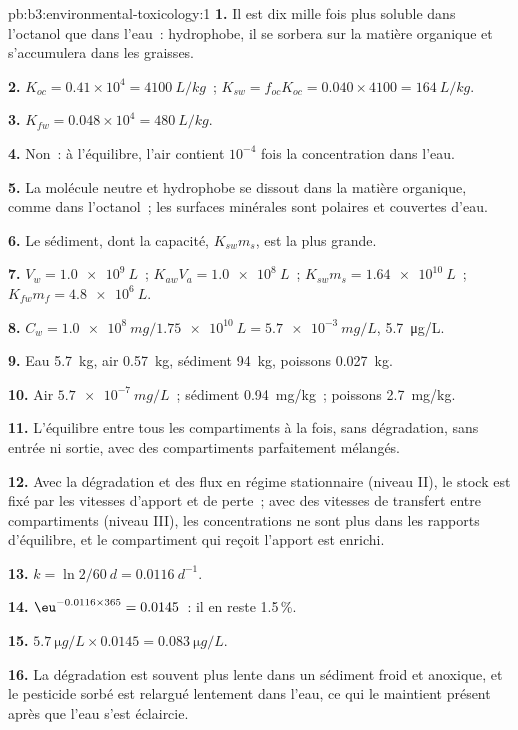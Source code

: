 \begin{solution}{pb:b3:environmental-toxicology:1}
\textbf{1.} Il est dix mille fois plus soluble dans l'octanol que dans
l'eau~: hydrophobe, il se sorbera sur la matière organique et s'accumulera
dans les graisses.

\textbf{2.} $K_{oc} = 0.41 \times 10^4 = \qty{4100}{L/kg}$~; $K_{sw} = f_{oc}K_{oc} = 0.040 \times 4100 = \qty{164}{L/kg}$.

\textbf{3.} $K_{fw} = 0.048 \times 10^4 = \qty{480}{L/kg}$.

\textbf{4.} Non~: à l'équilibre, l'air contient $10^{-4}$ fois la concentration dans l'eau.

\textbf{5.} La molécule neutre et hydrophobe se dissout dans la matière
organique, comme dans l'octanol~; les surfaces minérales sont polaires et
couvertes d'eau.

\textbf{6.} Le sédiment, dont la capacité, $K_{sw}m_s$, est la plus grande.

\textbf{7.} $V_w = \qty{1.0e9}{L}$~; $K_{aw}V_a = \qty{1.0e8}{L}$~; $K_{sw}m_s = \qty{1.64e10}{L}$~; $K_{fw}m_f = \qty{4.8e6}{L}$.

\textbf{8.} $C_w = \qty{1.0e8}{mg}/\qty{1.75e10}{L} = \qty{5.7e-3}{mg/L}$, \qty{5.7}{\micro g/L}.

\textbf{9.} Eau \qty{5.7}{kg}, air \qty{0.57}{kg}, sédiment \qty{94}{kg}, poissons \qty{0.027}{kg}.

\textbf{10.} Air $\qty{5.7e-7}{mg/L}$~; sédiment \qty{0.94}{mg/kg}~; poissons \qty{2.7}{mg/kg}.

\textbf{11.} L'équilibre entre tous les compartiments à la fois, sans
dégradation, sans entrée ni sortie, avec des compartiments parfaitement
mélangés.

\textbf{12.} Avec la dégradation et des flux en régime stationnaire (niveau
II), le stock est fixé par les vitesses d'apport et de perte~; avec des
vitesses de transfert entre compartiments (niveau III), les concentrations
ne sont plus dans les rapports d'équilibre, et le compartiment qui reçoit
l'apport est enrichi.

\textbf{13.} $k = \ln 2/\qty{60}{d} = \qty{0.0116}{d^{-1}}$.

\textbf{14.} $\eu^{-0.0116 \times 365} = 0.0145$~: il en reste 1.5\,\%.

\textbf{15.} $\qty{5.7}{\micro g/L} \times 0.0145 = \qty{0.083}{\micro g/L}$.

\textbf{16.} La dégradation est souvent plus lente dans un sédiment froid et
anoxique, et le pesticide sorbé est relargué lentement dans l'eau, ce qui
le maintient présent après que l'eau s'est éclaircie.


\end{solution}
